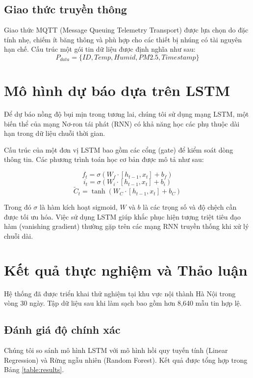 \documentclass[11pt,a4paper]{article} %
\begin{document}
\subsection{Giao thức truyền thông}
Giao thức MQTT (Message Queuing Telemetry Transport) được lựa chọn do đặc tính nhẹ, chiếm ít băng thông và phù hợp cho các thiết bị nhúng có tài nguyên hạn chế. Cấu trúc một gói tin dữ liệu được định nghĩa như sau:
\begin{equation}
    P_{data} = \{ID, Temp, Humid, PM2.5, Timestamp\}
\end{equation}

\section{Mô hình dự báo dựa trên LSTM}
Để dự báo nồng độ bụi mịn trong tương lai, chúng tôi sử dụng mạng LSTM, một biến thể của mạng Nơ-ron tái phát (RNN) có khả năng học các phụ thuộc dài hạn trong dữ liệu chuỗi thời gian.

Cấu trúc của một đơn vị LSTM bao gồm các cổng (gate) để kiểm soát dòng thông tin. Các phương trình toán học cơ bản được mô tả như sau:

\begin{equation}
    f_t = \sigma(W_f \cdot [h_{t-1}, x_t] + b_f)
\end{equation}
\begin{equation}
    i_t = \sigma(W_i \cdot [h_{t-1}, x_t] + b_i)
\end{equation}
\begin{equation}
    \tilde{C}_t = \tanh(W_C \cdot [h_{t-1}, x_t] + b_C)
\end{equation}

Trong đó $\sigma$ là hàm kích hoạt sigmoid, $W$ và $b$ là các trọng số và độ chệch cần được tối ưu hóa. Việc sử dụng LSTM giúp khắc phục hiện tượng triệt tiêu đạo hàm (vanishing gradient) thường gặp trên các mạng RNN truyền thống khi xử lý chuỗi dài.

\section{Kết quả thực nghiệm và Thảo luận}
Hệ thống đã được triển khai thử nghiệm tại khu vực nội thành Hà Nội trong vòng 30 ngày. Tập dữ liệu sau khi làm sạch bao gồm hơn 8,640 mẫu tin hợp lệ.

\subsection{Đánh giá độ chính xác}
Chúng tôi so sánh mô hình LSTM với mô hình hồi quy tuyến tính (Linear Regression) và Rừng ngẫu nhiên (Random Forest). Kết quả được tổng hợp trong Bảng \ref{table:results}.
\end{document}
